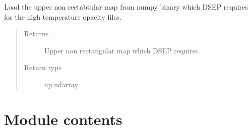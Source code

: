 \documentclass[letterpaper,10pt,english]{sphinxmanual}
\begin{document}
\begin{fulllineitems}
\label{\detokenize{pyTOPSScrape.misc:pyTOPSScrape.misc.utils.load_non_rect_map}}
\sphinxAtStartPar
Load the upper non rectabtular map from numpy binary which DSEP requires
for the high temperature opacity files.
\begin{quote}\begin{description}
\item[{Returns}] \leavevmode
\sphinxAtStartPar
{} \textendash{} Upper non rectangular map which DSEP requires.

\item[{Return type}] \leavevmode
\sphinxAtStartPar
np.ndarray

\end{description}\end{quote}

\end{fulllineitems}



\section{Module contents}
\label{\detokenize{pyTOPSScrape.misc:module-pyTOPSScrape.misc}}\label{\detokenize{pyTOPSScrape.misc:module-contents}}
\end{document}
